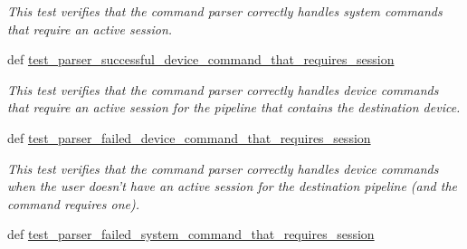 \begin{DoxyCompactItemize}
\begin{DoxyCompactList}\small\item\em This test verifies that the command parser correctly handles system commands that require an active session. \end{DoxyCompactList}\item 
\hypertarget{classhwm_1_1command_1_1tests_1_1test__command__infrastructure_1_1_test_command_infrastructure_afca717e262c877d0fe48cd76fa1e77d8}{def \hyperlink{classhwm_1_1command_1_1tests_1_1test__command__infrastructure_1_1_test_command_infrastructure_afca717e262c877d0fe48cd76fa1e77d8}{test\-\_\-parser\-\_\-successful\-\_\-device\-\_\-command\-\_\-that\-\_\-requires\-\_\-session}}\label{classhwm_1_1command_1_1tests_1_1test__command__infrastructure_1_1_test_command_infrastructure_afca717e262c877d0fe48cd76fa1e77d8}

\begin{DoxyCompactList}\small\item\em This test verifies that the command parser correctly handles device commands that require an active session for the pipeline that contains the destination device. \end{DoxyCompactList}\item 
\hypertarget{classhwm_1_1command_1_1tests_1_1test__command__infrastructure_1_1_test_command_infrastructure_a7455322ee635318f3071668d29831d43}{def \hyperlink{classhwm_1_1command_1_1tests_1_1test__command__infrastructure_1_1_test_command_infrastructure_a7455322ee635318f3071668d29831d43}{test\-\_\-parser\-\_\-failed\-\_\-device\-\_\-command\-\_\-that\-\_\-requires\-\_\-session}}\label{classhwm_1_1command_1_1tests_1_1test__command__infrastructure_1_1_test_command_infrastructure_a7455322ee635318f3071668d29831d43}

\begin{DoxyCompactList}\small\item\em This test verifies that the command parser correctly handles device commands when the user doesn't have an active session for the destination pipeline (and the command requires one). \end{DoxyCompactList}\item 
\hypertarget{classhwm_1_1command_1_1tests_1_1test__command__infrastructure_1_1_test_command_infrastructure_ac00f7af71845ae8c042d43b23a85db8d}{def \hyperlink{classhwm_1_1command_1_1tests_1_1test__command__infrastructure_1_1_test_command_infrastructure_ac00f7af71845ae8c042d43b23a85db8d}{test\-\_\-parser\-\_\-failed\-\_\-system\-\_\-command\-\_\-that\-\_\-requires\-\_\-session}}\label{classhwm_1_1command_1_1tests_1_1test__command__infrastructure_1_1_test_command_infrastructure_ac00f7af71845ae8c042d43b23a85db8d}


\end{DoxyCompactItemize}
